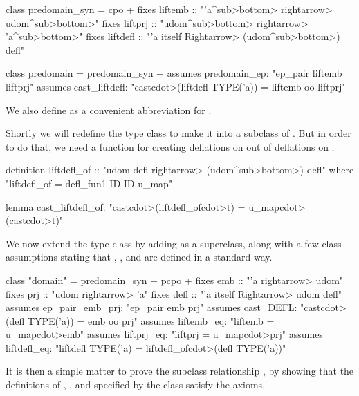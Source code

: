 \begin{isacode}
class predomain_syn = cpo +
  fixes liftemb :: "'a\<^sub>\<bottom> \<rightarrow> udom\<^sub>\<bottom>"
  fixes liftprj :: "udom\<^sub>\<bottom> \<rightarrow> 'a\<^sub>\<bottom>"
  fixes liftdefl :: "'a itself \<Rightarrow> (udom\<^sub>\<bottom>) defl"
\end{isacode}
\unmedskip
{}
\begin{isacode}
class predomain = predomain_syn +
  assumes predomain_ep: "ep_pair liftemb liftprj"
  assumes cast_liftdefl: "cast\<cdot>(liftdefl TYPE('a)) = liftemb oo liftprj"
\end{isacode}
%
We also define  as a convenient abbreviation for .

Shortly we will redefine the  type class to make it into a subclass of . But in order to do that, we need a function for creating deflations on  out of deflations on .

\begin{isacode}
definition liftdefl_of :: "udom defl \<rightarrow> (udom\<^sub>\<bottom>) defl"
  where "liftdefl_of = defl_fun1 ID ID u_map"
\end{isacode}
\unmedskip
{}
\begin{isacode}
lemma cast_liftdefl_of: "cast\<cdot>(liftdefl_of\<cdot>t) = u_map\<cdot>(cast\<cdot>t)"
\end{isacode}
%
We now extend the  type class by adding  as a superclass, along with a few class assumptions stating that , , and  are defined in a standard way.
%
\begin{isacode}
class "domain" = predomain_syn + pcpo +
  fixes emb :: "'a \<rightarrow> udom"
  fixes prj :: "udom \<rightarrow> 'a"
  fixes defl :: "'a itself \<Rightarrow> udom defl"
  assumes ep_pair_emb_prj: "ep_pair emb prj"
  assumes cast_DEFL: "cast\<cdot>(defl TYPE('a)) = emb oo prj"
  assumes liftemb_eq: "liftemb = u_map\<cdot>emb"
  assumes liftprj_eq: "liftprj = u_map\<cdot>prj"
  assumes liftdefl_eq: "liftdefl TYPE('a) = liftdefl_of\<cdot>(defl TYPE('a))"
\end{isacode}
%
It is then a simple matter to prove the subclass relationship , by showing that the definitions of , , and  specified by the  class satisfy the  axioms.

